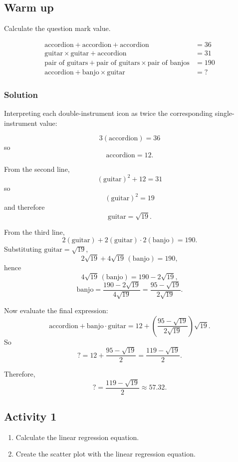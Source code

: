 \documentclass[12pt]{article}
\begin{document}
	
	\subsection{Warm up}
	
	Calculate the question mark value.
	
	\[
	\begin{aligned}
		\text{accordion} + \text{accordion} + \text{accordion} &= 36 \\
		\text{guitar} \times \text{guitar} + \text{accordion} &= 31 \\
		\text{pair of guitars} + \text{pair of guitars} \times \text{pair of banjos} &= 190 \\
		\text{accordion} + \text{banjo} \times \text{guitar} &= ?
	\end{aligned}
	\]
	
	\subsubsection*{Solution}
	
	Interpreting each double-instrument icon as twice the corresponding single-instrument value:
	
	\[
	3(\text{accordion})=36
	\]
	so
	\[
	\text{accordion}=12.
	\]
	
	From the second line,
	\[
	(\text{guitar})^2+12=31
	\]
	so
	\[
	(\text{guitar})^2=19
	\]
	and therefore
	\[
	\text{guitar}=\sqrt{19}.
	\]
	
	From the third line,
	\[
	2(\text{guitar})+2(\text{guitar})\cdot 2(\text{banjo})=190.
	\]
	Substituting \(\text{guitar}=\sqrt{19}\),
	\[
	2\sqrt{19}+4\sqrt{19}\,(\text{banjo})=190,
	\]
	hence
	\[
	4\sqrt{19}\,(\text{banjo})=190-2\sqrt{19},
	\]
	\[
	\text{banjo}=\frac{190-2\sqrt{19}}{4\sqrt{19}}
	=\frac{95-\sqrt{19}}{2\sqrt{19}}.
	\]
	
	Now evaluate the final expression:
	\[
	\text{accordion}+\text{banjo}\cdot\text{guitar}
	=12+\left(\frac{95-\sqrt{19}}{2\sqrt{19}}\right)\sqrt{19}.
	\]
	So
	\[
	?=12+\frac{95-\sqrt{19}}{2}
	=\frac{119-\sqrt{19}}{2}.
	\]
	
	Therefore,
	\[
	?=\frac{119-\sqrt{19}}{2}\approx 57.32.
	\]
	
	\subsection{Activity 1}
	
	\begin{enumerate}
		\item Calculate the linear regression equation.
		\item Create the scatter plot with the linear regression equation.
	\end{enumerate}
	
\end{document}
